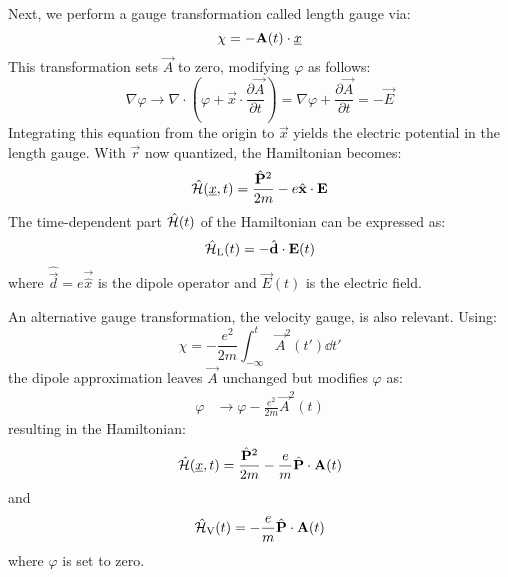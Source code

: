 Next, we perform a gauge transformation called length gauge via:
\begin{equation}
    \chi = -\mathbf{A}(t)\cdot \underline{x}
\end{equation}
This transformation sets $\vec{A}$ to zero, modifying $\varphi$ as follows:%
\begin{equation}
    \nabla \varphi \to \nabla \cdot (\varphi + \vec{x} \cdot \frac{\partial \vec{A}}{\partial t}) = \nabla \varphi + \frac{\partial \vec{A}}{\partial t} = - \vec{E}
\end{equation}
Integrating this equation from the origin to $\vec{x}$ yields the electric potential in the length gauge. %
With $\vec{r}$ now quantized, the Hamiltonian becomes:
\begin{equation*}%
    \hat{\Hs}(\uvec{x}, t) = \frac{\hat{\vec{P}}^2}{2m} - e \hat{\vec{x}} \cdot \vec{E}%
\end{equation*}
The time-dependent part $\hat{\mathcal{H}}(t)$ of the Hamiltonian can be expressed as:
\begin{equation}
    \hat{\mathcal{H}}_{\mathrm{L}}(t) = -\hat{\mathbf{d}} \cdot \mathbf{E}(t) \label{eq:dipoleApprox}
\end{equation}
where $\hat{\vec{d}}=e\vec{\hat{x}}$ is the dipole operator and $\vec{E}(t)$ is the electric field.

An alternative gauge transformation, the velocity gauge, is also relevant. 
Using:
\begin{equation*}
    \chi = -\frac{e^2}{2m}\int_{-\infty}^{t} \vec{A}^2(t') \dd t'
\end{equation*}
the dipole approximation leaves $\vec{A}$ unchanged but modifies $\varphi$ as:
\begin{align*}
    \varphi &\to \varphi -\frac{e^2}{2m}\vec{A}^2(t)
\end{align*}
resulting in the Hamiltonian:
\begin{equation*}
    \hat{\mathcal{H}}(\underline{x}, t) = \frac{\hat{\mathbf{P}}^2}{2m} -\frac{e}{m}\hat{\mathbf{P}} \cdot \mathbf{A}(t)
\end{equation*}
and
\begin{equation}
    \hat{\mathcal{H}}_{\mathrm{V}}(t) = -\frac{e}{m}\hat{\mathbf{P}} \cdot \mathbf{A}(t) \label{eq:dipoleApprox_velocity}
\end{equation}
where $\varphi$ is set to zero.

